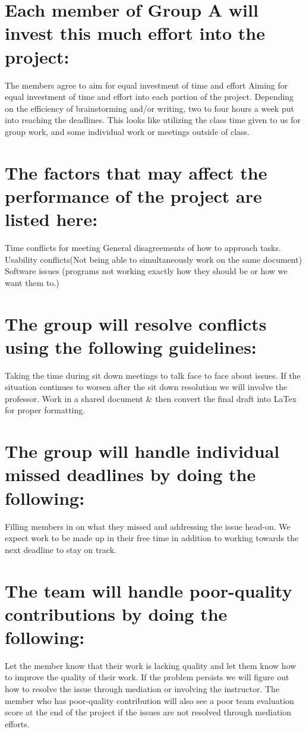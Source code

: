 \documentclass[12pt,A4paper]{article}
\begin{document}
\section{Each member of Group A will invest this much effort into the project:}
	The members agree to aim for equal investment of time and effort
	Aiming for equal investment of time and effort into each portion of the project. 
	Depending on the efficiency of brainstorming and/or writing, two to four hours a week put into reaching the deadlines. This looks like utilizing the class time given to us for group work, and some individual work or meetings outside of class. 
	
\section{The factors that may affect the performance of the project are listed here:}
	Time conflicts for meeting
	General disagreements of how to approach tasks.
	Usability conflicts(Not being able to simultaneously work on the same document)
	Software issues (programs not working exactly how they should be or how we want them to.)
	
\section{The group will resolve conflicts using the following guidelines:}
	Taking the time during sit down meetings to talk face to face about issues. If the situation continues to worsen after the sit down resolution we will involve the professor.
	Work in a shared document \& then convert the final draft into LaTex for proper formatting.
	
\section{The group will handle individual missed deadlines by doing the following:}
	Filling members in on what they missed and addressing the issue head-on. We expect work to be made up in their free time in addition to working towards the next deadline to stay on track.
	
\section{The team will handle poor-quality contributions by doing the following:}
	Let the member know that their work is lacking quality and let them know how to improve the quality of their work. If the problem persists we will figure out how to resolve the issue through mediation or involving the instructor. The member who has poor-quality contribution will also see a poor team evaluation score at the end of the project if the issues are not resolved through mediation efforts.
	
\end{document}
